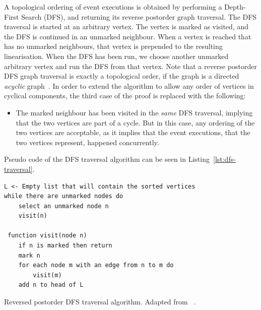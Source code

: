 \documentclass{article}
\begin{document}
	A topological ordering of event executions is obtained by performing a Depth-First Search (DFS), and returning its reverse postorder graph traversal.
	The DFS traversal is started at an arbitrary vertex.
	The vertex is marked as visited, and the DFS is continued in an unmarked neighbour.
	When a vertex is reached that has no unmarked neighbours, that vertex is prepended to the resulting linearisation.
	When the DFS has been run, we choose another unmarked arbitrary vertex and run the DFS from that vertex.
	Note that a reverse postorder DFS graph traversal is exactly a topological order, if the graph is a directed \textit{acyclic} graph~\cite[chapter 4, page 582]{sedgewick_algorithms_2011}.
	In order to extend the algorithm to allow any order of vertices in cyclical components, the third case of the proof is replaced with the following:
	\begin{itemize}
		\item The marked neighbour has been visited in the \textit{same} DFS traversal, implying that the two vertices are part of a cycle.
		But in this case, any ordering of the two vertices are acceptable, as it implies that the event executions, that the two vertices represent, happened concurrently.
	\end{itemize}
	Pseudo code of the DFS traversal algorithm can be seen in Listing~\ref{lst:dfs-traversal}.
\begin{snippet}
\begin{mdframed}[backgroundcolor=Papyrus]
	\begin{lstlisting}[style=pseudo, keywords={}]
L <- Empty list that will contain the sorted vertices
while there are unmarked nodes do
    select an unmarked node n
    visit(n)

 function visit(node n)
    if n is marked then return
    mark n
    for each node m with an edge from n to m do
        visit(m)
    add n to head of L
	\end{lstlisting}
\end{mdframed}
\caption{Reversed postorder DFS traversal algorithm. Adapted from~\cite{_topological_2018} \label{lst:dfs-traversal}.}
\end{snippet}
\end{document}
